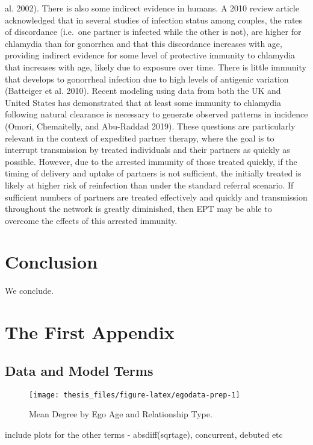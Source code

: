 \documentclass [11pt, proquest] {uwthesis}[2015/03/03]
\begin{document}
al. 2002). There is also some indirect evidence in humans. A 2010 review
article acknowledged that in several studies of infection status among
couples, the rates of discordance (i.e.~one partner is infected while
the other is not), are higher for chlamydia than for gonorrhea and that
this discordance increases with age, providing indirect evidence for
some level of protective immunity to chlamydia that increases with age,
likely due to exposure over time. There is little immunity that develops
to gonorrheal infection due to high levels of antigenic variation
(Batteiger et al. 2010). Recent modeling using data from both the UK and
United States has demonstrated that at least some immunity to chlamydia
following natural clearance is necessary to generate observed patterns
in incidence (Omori, Chemaitelly, and Abu-Raddad 2019). These questions
are particularly relevant in the context of expedited partner therapy,
where the goal is to interrupt transmission by treated individuals and
their partners as quickly as possible. However, due to the arrested
immunity of those treated quickly, if the timing of delivery and uptake
of partners is not sufficient, the initially treated is likely at higher
risk of reinfection than under the standard referral scenario. If
sufficient numbers of partners are treated effectively and quickly and
transmission throughout the network is greatly diminished, then EPT may
be able to overcome the effects of this arrested immunity.

\chapter*{Conclusion}\label{conclusion}

We conclude.

\appendix

\chapter{The First Appendix}\label{the-first-appendix}

\section{Data and Model Terms}\label{data-and-model-terms}
\begin{figure}

{\centering \texttt{[image: thesis\_files/figure-latex/egodata-prep-1]} 

}

\caption{Mean Degree by Ego Age and Relationship Type.}\label{fig:egodata-prep}
\end{figure}
include plots for the other terms - absdiff(sqrtage), concurrent,
debuted etc
\end{document}
